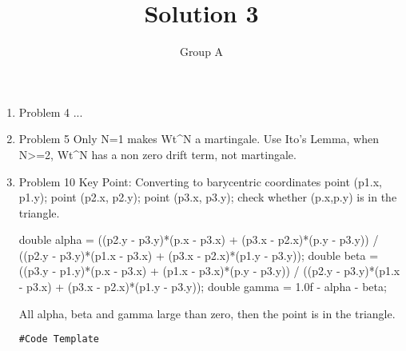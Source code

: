 \documentclass[10pt, onecolumn, draftcls]{IEEEtran}
\begin{document}
\title{Solution 3}
\author{Group A}
\maketitle


\begin{enumerate}
\item 
Problem 4
...
\item
Problem 5
Only N=1 makes Wt^N a martingale.
Use Ito's Lemma, when N>=2, Wt^N has a non zero drift term, not martingale.
\item
Problem 10
Key Point: Converting to barycentric coordinates
point (p1.x, p1.y);
point (p2.x, p2.y);
point (p3.x, p3.y);
check whether (p.x,p.y) is in the triangle.

double alpha = ((p2.y - p3.y)*(p.x - p3.x) + (p3.x - p2.x)*(p.y - p3.y)) /
            ((p2.y - p3.y)*(p1.x - p3.x) + (p3.x - p2.x)*(p1.y - p3.y));
double beta = ((p3.y - p1.y)*(p.x - p3.x) + (p1.x - p3.x)*(p.y - p3.y)) /
            ((p2.y - p3.y)*(p1.x - p3.x) + (p3.x - p2.x)*(p1.y - p3.y));
double gamma = 1.0f - alpha - beta;

All alpha, beta and gamma large than zero, then the point is in the triangle.
\begin{lstlisting}
#Code Template
\end{lstlisting}
 
\end{enumerate}
\end{document}
